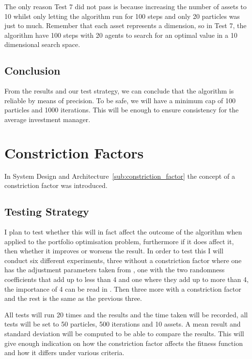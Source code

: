 \documentclass{pdfmx4020}
\begin{document}
      The only reason Test 7 did not pass is because increasing the number of assets to 10 whilst only letting the algorithm run for 100 steps and only 20 particles was just to much. Remember that each asset represents a dimension, so in Test 7, the algorithm have 100 steps with 20 agents to search for an optimal value in a 10 dimensional search space.

    \subsection{Conclusion} %
    \label{sub:conclusion}
    From the results and our test strategy, we can conclude that the algorithm is reliable by means of precision. To be safe, we will have a minimum cap of 100 particles and 1000 iterations. This will be enough to ensure consistency for the average investment manager.       

  \section{Constriction Factors} %
  \label{sec:constriction_factors}
  In System Design and Architecture~\ref{sub:constriction_factor} the concept of a constriction factor was introduced. 
    
    \subsection{Testing Strategy} %
    \label{sub:testing_strategy}
      I plan to test whether this will in fact affect the outcome of the algorithm when applied to the portfolio optimisation problem, furthermore if it does affect it, then whether it improves or worsens the result. In order to test this I will conduct six different experiments, three without a constriction factor where one has the adjustment parameters taken from \cite{constriction_factor_3}, one with the two randomness coefficients that add up to less than 4 and one where they add up to more than 4, the importance of 4 can be read in \cite{constriction_factor}. Then three more with a constriction factor and the rest is the same as the previous three.

      All tests will run 20 times and the results and the time taken will be recorded, all tests will be set to 50 particles, 500 iterations and 10 assets. A mean result and standard deviation will be computed to be able to compare the results. This will give enough indication on how the constriction factor affects the fitness function and how it differs under various criteria.  
\end{document}
